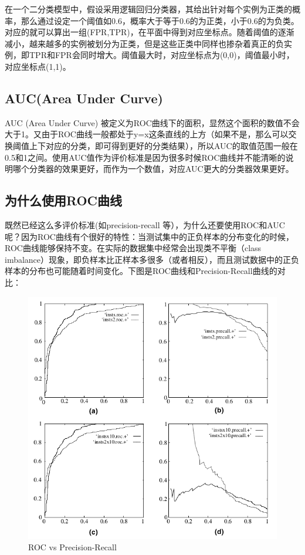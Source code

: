 \documentclass[12pt]{article}
\begin{document}
在一个二分类模型中，假设采用逻辑回归分类器，其给出针对每个实例为正类的概率，那么通过设定一个阈值如0.6，概率大于等于0.6的为正类，小于0.6的为负类。对应的就可以算出一组(FPR,TPR)，在平面中得到对应坐标点。随着阈值的逐渐减小，越来越多的实例被划分为正类，但是这些正类中同样也掺杂着真正的负实例，即TPR和FPR会同时增大。阈值最大时，对应坐标点为(0,0)，阈值最小时，对应坐标点(1,1)。

\subsection{AUC(Area Under Curve)}
AUC (Area Under Curve) 被定义为ROC曲线下的面积，显然这个面积的数值不会大于1。又由于ROC曲线一般都处于y=x这条直线的上方（如果不是，那么可以交换阈值上下对应的分类，即可得到更好的分类结果），所以AUC的取值范围一般在0.5和1之间。使用AUC值作为评价标准是因为很多时候ROC曲线并不能清晰的说明哪个分类器的效果更好，而作为一个数值，对应AUC更大的分类器效果更好。

\subsection{为什么使用ROC曲线}
既然已经这么多评价标准(如precision-recall 等），为什么还要使用ROC和AUC呢？因为ROC曲线有个很好的特性：当测试集中的正负样本的分布变化的时候，ROC曲线能够保持不变。在实际的数据集中经常会出现类不平衡（class imbalance）现象，即负样本比正样本多很多（或者相反），而且测试数据中的正负样本的分布也可能随着时间变化。下图是ROC曲线和Precision-Recall曲线的对比：

\begin{figure}[ht]
  \centering
  \includegraphics[width=.8\textwidth]{fig/ROC_vs_Precision_Recall.png} %
  \caption{ROC vs Precision-Recall} %
  \label{ROC_vs_Precision_Recall} %
\end{figure}
\end{document}
